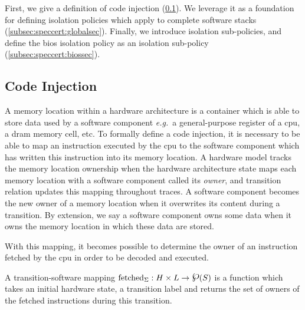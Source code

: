 First, we give a definition of code injection (\ref{subsec:speccert:tampering}).
%
We leverage it as a foundation for defining isolation policies which apply to
complete software stacks (\ref{subsec:speccert:globalsec}). 
%
Finally, we introduce isolation sub-policies, and define the \ac{bios} isolation
policy as an isolation sub-policy (\ref{subsec:speccert:biossec}).

\subsection{Code Injection}
\label{subsec:speccert:tampering}

A memory location within a hardware architecture is a container which is able to
store data used by a software component \emph{e.g.}~a general-purpose register
of a \ac{cpu}, a \ac{dram} memory cell, etc.
%
To formally define a code injection, it is necessary to be able to map an
instruction executed by the \ac{cpu} to the software component which has written
this instruction into its memory location.
%
A hardware model tracks the memory location ownership when the hardware
architecture state maps each memory location with a software component called
its \emph{owner}, and transition relation updates this mapping throughout
traces.
%
A software component becomes the new owner of a memory location when it
overwrites its content during a transition.  
%
By extension, we say a software component owns some data when it owns the memory
location in which these data are stored.

With this mapping, it becomes possible to determine the owner of an instruction
fetched by the \ac{cpu} in order to be decoded and executed.

\begin{definition}
  \label{def:speccert2:transsoft}
  A transition-software mapping
  $\func{fetched}_{\Sigma}: H \times L \rightarrow \powerset(S)$ is a function
  which takes an initial hardware state, a transition label and returns the set
  of owners of the fetched instructions during this transition.
\end{definition}


